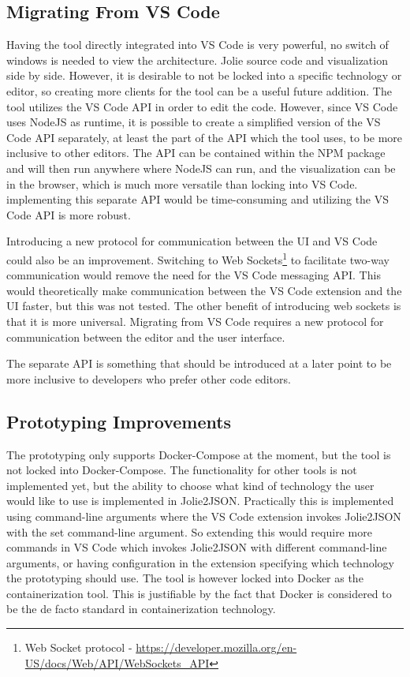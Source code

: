 \subsection{Migrating From VS Code}
Having the tool directly integrated into VS Code is very powerful, no switch of windows is needed to view the architecture. Jolie source code and visualization side by side.
However, it is desirable to not be locked into a specific technology or editor, so creating more clients for the tool can be a useful future addition.
The tool utilizes the VS Code API in order to edit the code. However, since VS Code uses NodeJS as runtime, it is possible to create
a simplified version of the VS Code API separately, at least the part of the API which the tool uses, to be more inclusive to other editors.
The API can be contained within the NPM package and will then run anywhere where NodeJS can run, and the visualization can be in the browser, which is much more versatile than locking into VS Code.
implementing this separate API would be time-consuming and utilizing the VS Code API is more robust.

Introducing a new protocol for communication between the UI and VS Code could also be an improvement. Switching to Web Sockets\footnote{Web Socket protocol - \url{https://developer.mozilla.org/en-US/docs/Web/API/WebSockets_API}} to facilitate two-way communication would remove the need for the VS Code messaging API.
This would theoretically make communication between the VS Code extension and the UI faster, but this was not tested. The other benefit of introducing web sockets is that it is more universal. Migrating from VS Code requires a new protocol for communication between the editor and the user interface.

The separate API is something that should be introduced at a later point to be more inclusive to developers who prefer other code editors.

\subsection{Prototyping Improvements}
The prototyping only supports Docker-Compose at the moment, but the tool is not locked into Docker-Compose. The functionality for other tools is not implemented yet, but the ability to choose what kind of technology the user would like to use is implemented in Jolie2JSON.
Practically this is implemented using command-line arguments where the VS Code extension invokes Jolie2JSON with the set command-line argument. So extending this would require more commands in VS Code which invokes Jolie2JSON with different command-line arguments, or having
configuration in the extension specifying which technology the prototyping should use.
The tool is however locked into Docker as the containerization tool. This is justifiable by the fact that Docker is considered to be the de facto standard in containerization technology.

